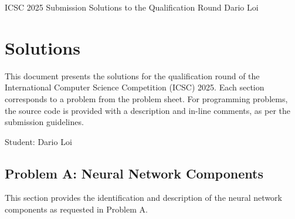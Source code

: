 \documentclass{solutionclass} %
\begin{document}
\pretitle
{ICSC 2025 Submission}                          %
{Solutions to the Qualification Round}          %
{Dario Loi} %

\makeatletter
    \startcontents[sections]
    \chapter{Solutions}
\makeatother

    This document presents the solutions for the qualification round of the International Computer Science Competition (ICSC) 2025. Each section corresponds to a problem from the problem sheet. For programming problems, the source code is provided with a description and in-line comments, as per the submission guidelines.

    Student: Dario Loi\\
    \divider

    \section{Problem A: Neural Network Components}
    This section provides the identification and description of the neural network components as requested in Problem A.
\end{document}
